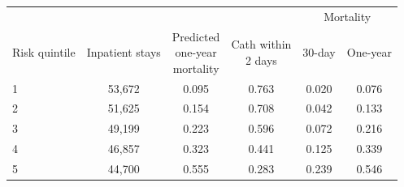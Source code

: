 \begin{tabular}{lccccc}
\toprule
 & & & & \multicolumn{2}{c}{Mortality} \\
\cmidrule(lr){5-6}
Risk quintile & Inpatient stays & \shortstack{Predicted \\ one-year \\ mortality} & \shortstack{Cath within \\ 2 days} & 30-day & One-year \\
\midrule
1 & 53,672 & 0.095 & 0.763 & 0.020 & 0.076 \\
2 & 51,625 & 0.154 & 0.708 & 0.042 & 0.133 \\
3 & 49,199 & 0.223 & 0.596 & 0.072 & 0.216 \\
4 & 46,857 & 0.323 & 0.441 & 0.125 & 0.339 \\
5 & 44,700 & 0.555 & 0.283 & 0.239 & 0.546 \\
\bottomrule
\end{tabular}

